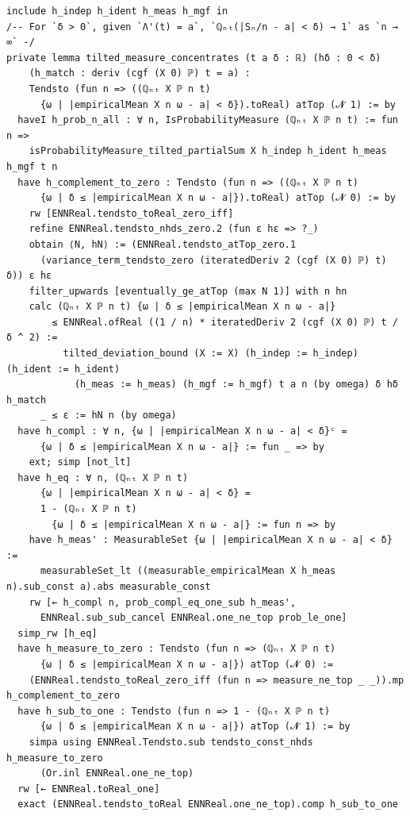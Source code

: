 \newpage
\begin{lstlisting}
include h_indep h_ident h_meas h_mgf in
/-- For `δ > 0`, given `Λ'(t) = a`, `ℚₙₜ(|Sₙ/n - a| < δ) → 1` as `n → ∞` -/
private lemma tilted_measure_concentrates (t a δ : ℝ) (hδ : 0 < δ)
    (h_match : deriv (cgf (X 0) ℙ) t = a) :
    Tendsto (fun n => ((ℚₙₜ X ℙ n t)
      {ω | |empiricalMean X n ω - a| < δ}).toReal) atTop (𝓝 1) := by
  haveI h_prob_n_all : ∀ n, IsProbabilityMeasure (ℚₙₜ X ℙ n t) := fun n =>
    isProbabilityMeasure_tilted_partialSum X h_indep h_ident h_meas h_mgf t n
  have h_complement_to_zero : Tendsto (fun n => ((ℚₙₜ X ℙ n t)
      {ω | δ ≤ |empiricalMean X n ω - a|}).toReal) atTop (𝓝 0) := by
    rw [ENNReal.tendsto_toReal_zero_iff]
    refine ENNReal.tendsto_nhds_zero.2 (fun ε hε => ?_)
    obtain ⟨N, hN⟩ := (ENNReal.tendsto_atTop_zero.1
      (variance_term_tendsto_zero (iteratedDeriv 2 (cgf (X 0) ℙ) t) δ)) ε hε
    filter_upwards [eventually_ge_atTop (max N 1)] with n hn
    calc (ℚₙₜ X ℙ n t) {ω | δ ≤ |empiricalMean X n ω - a|}
        ≤ ENNReal.ofReal ((1 / n) * iteratedDeriv 2 (cgf (X 0) ℙ) t / δ ^ 2) :=
          tilted_deviation_bound (X := X) (h_indep := h_indep) (h_ident := h_ident)
            (h_meas := h_meas) (h_mgf := h_mgf) t a n (by omega) δ hδ h_match
      _ ≤ ε := hN n (by omega)
  have h_compl : ∀ n, {ω | |empiricalMean X n ω - a| < δ}ᶜ =
      {ω | δ ≤ |empiricalMean X n ω - a|} := fun _ => by
    ext; simp [not_lt]
  have h_eq : ∀ n, (ℚₙₜ X ℙ n t)
      {ω | |empiricalMean X n ω - a| < δ} =
      1 - (ℚₙₜ X ℙ n t)
        {ω | δ ≤ |empiricalMean X n ω - a|} := fun n => by
    have h_meas' : MeasurableSet {ω | |empiricalMean X n ω - a| < δ} :=
      measurableSet_lt ((measurable_empiricalMean X h_meas n).sub_const a).abs measurable_const
    rw [← h_compl n, prob_compl_eq_one_sub h_meas',
      ENNReal.sub_sub_cancel ENNReal.one_ne_top prob_le_one]
  simp_rw [h_eq]
  have h_measure_to_zero : Tendsto (fun n => (ℚₙₜ X ℙ n t)
      {ω | δ ≤ |empiricalMean X n ω - a|}) atTop (𝓝 0) :=
    (ENNReal.tendsto_toReal_zero_iff (fun n => measure_ne_top _ _)).mp h_complement_to_zero
  have h_sub_to_one : Tendsto (fun n => 1 - (ℚₙₜ X ℙ n t)
      {ω | δ ≤ |empiricalMean X n ω - a|}) atTop (𝓝 1) := by
    simpa using ENNReal.Tendsto.sub tendsto_const_nhds h_measure_to_zero
      (Or.inl ENNReal.one_ne_top)
  rw [← ENNReal.toReal_one]
  exact (ENNReal.tendsto_toReal ENNReal.one_ne_top).comp h_sub_to_one
\end{lstlisting}
\newpage
